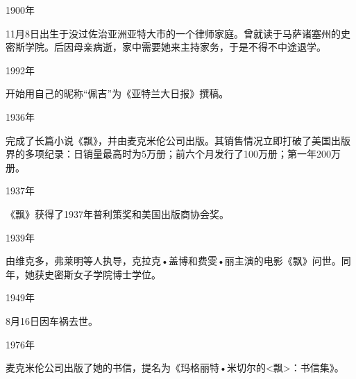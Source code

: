 \par 1900年
\par 11月8日出生于没过佐治亚洲亚特大市的一个律师家庭。曾就读于马萨诸塞州的史密斯学院。后因母亲病逝，家中需要她来主持家务，于是不得不中途退学。
\par 1992年
\par 开始用自己的昵称“佩吉”为《亚特兰大日报》撰稿。
\par 1936年
\par 完成了长篇小说《飘》，并由麦克米伦公司出版。其销售情况立即打破了美国出版界的多项纪录：日销量最高时为5万册；前六个月发行了100万册；第一年200万册。
\par 1937年
\par 《飘》获得了1937年普利策奖和美国出版商协会奖。
\par 1939年
\par 由维克多，弗莱明等人执导，克拉克•盖博和费雯•丽主演的电影《飘》问世。同年，她获史密斯女子学院博士学位。
\par 1949年
\par 8月16日因车祸去世。
\par 1976年
\par 麦克米伦公司出版了她的书信，提名为《玛格丽特•米切尔的<飘>：书信集》。






